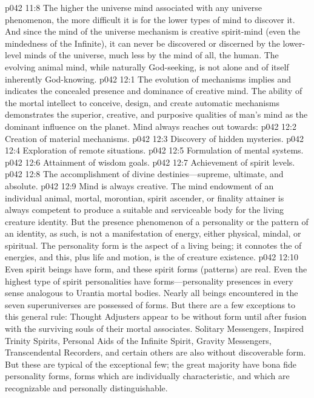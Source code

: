 \vs p042 11:8 The higher the universe mind associated with any universe phenomenon, the more difficult it is for the lower types of mind to discover it. And since the mind of the universe mechanism is creative spirit\hyp{}mind (even the mindedness of the Infinite), it can never be discovered or discerned by the lower\hyp{}level minds of the universe, much less by the  mind of all, the human. The evolving animal mind, while naturally God\hyp{}seeking, is not alone and of itself inherently God\hyp{}knowing.
\vs p042 12:1 The evolution of mechanisms implies and indicates the concealed presence and dominance of creative mind. The ability of the mortal intellect to conceive, design, and create automatic mechanisms demonstrates the superior, creative, and purposive qualities of man’s mind as the dominant influence on the planet. Mind always reaches out towards:
\pc \vs p042 12:2 \bibnobreakspace Creation of material mechanisms.
\vs p042 12:3 \bibnobreakspace Discovery of hidden mysteries.
\vs p042 12:4 \bibnobreakspace Exploration of remote situations.
\vs p042 12:5 \bibnobreakspace Formulation of mental systems.
\vs p042 12:6 \bibnobreakspace Attainment of wisdom goals.
\vs p042 12:7 \bibnobreakspace Achievement of spirit levels.
\vs p042 12:8 \bibnobreakspace The accomplishment of divine des\-ti\-nies---supreme, ultimate, and absolute.
\pc \vs p042 12:9 Mind is always creative. The mind endowment of an individual animal, mortal, morontian, spirit ascender, or finality attainer is always competent to produce a suitable and serviceable body for the living creature identity. But the presence phenomenon of a personality or the pattern of an identity, as such, is not a manifestation of energy, either physical, mindal, or spiritual. The personality form is the  aspect of a living being; it connotes the  of energies, and this, plus life and motion, is the  of creature existence.
\vs p042 12:10 Even spirit beings have form, and these spirit forms (patterns) are real. Even the highest type of spirit personalities have forms---personality presences in every sense analogous to Urantia mortal bodies. Nearly all beings encountered in the seven superuniverses are possessed of forms. But there are a few exceptions to this general rule: Thought Adjusters appear to be without form until after fusion with the surviving souls of their mortal associates. Solitary Messengers, Inspired Trinity Spirits, Personal Aids of the Infinite Spirit, Gravity Messengers, Transcendental Recorders, and certain others are also without discoverable form. But these are typical of the exceptional few; the great majority have bona fide personality forms, forms which are individually characteristic, and which are recognizable and personally distinguishable.
